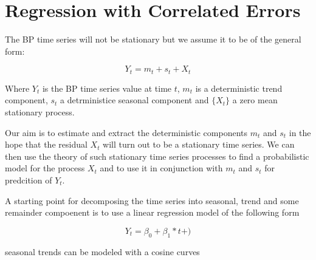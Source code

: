 
\section{Regression with Correlated Errors}
The BP time series will not be stationary but we assume it to be of the general form:

\[ Y_t= m_t + s_t + X_t \]

Where $Y_t$ is the BP time series value at time $t$, $m_t$ is a deterministic trend component,
$s_t$ a detrministice seasonal component and $\{X_t\}$ a zero mean stationary process.



Our aim is to estimate and extract the deterministic components $m_t$ and $s_t$ in the
hope that the residual $X_t$ will turn out to be a stationary time series.
We can then use the theory of such stationary time series processes to find a probabilistic model
for the process $X_t$ and to use it in conjunction with $m_t$ and $s_t$ for predcition of ${Y_t}$.


A starting point for decomposing the time series into seasonal, trend and some remainder compoenent is to use a linear
regression model of the following form

\[ Y_t = \beta_0 + \beta_1 * t + ) \]

seasonal trends can be modeled with a cosine curves

\section{}